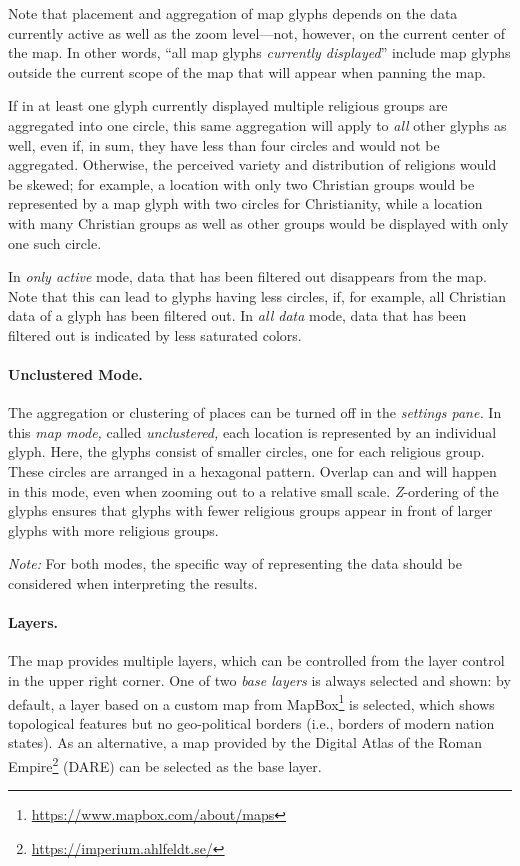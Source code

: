 Note that placement and aggregation of map glyphs depends on the data currently active as well as the zoom level---not, however, on the current center of the map.
In other words, \enquote{all map glyphs \emph{currently displayed}} include map glyphs outside the current scope of the map that will appear when panning the map.

If in at least one glyph currently displayed multiple religious groups are aggregated into one circle, this same aggregation will apply to \emph{all} other glyphs as well, even if, in sum, they have less than four circles and would not be aggregated.
Otherwise, the perceived variety and distribution of religions would be skewed;
for example, a location with only two Christian groups would be represented by a map glyph with two circles for Christianity, while a location with many Christian groups as well as other groups would be displayed with only one such circle.

In \emph{only active} mode, data that has been filtered out disappears from the map.
Note that this can lead to glyphs having less circles, if, for example, all Christian data of a glyph has been filtered out.
In \emph{all data} mode, data that has been filtered out is indicated by less saturated colors.

\paragraph{Unclustered Mode.}
\label{sec:map-unclustered-mode}
The aggregation or clustering of places can be turned off in the \emph{settings pane.}
In this \emph{map mode,} called \emph{unclustered,} each location is represented by an individual glyph.
Here, the glyphs consist of smaller circles, one for each religious group.
These circles are arranged in a hexagonal pattern.
Overlap can and will happen in this mode, even when zooming out to a relative small scale.
\emph{Z}-ordering of the glyphs ensures that glyphs with fewer religious groups appear in front of larger glyphs with more religious groups.

\emph{Note:} For both modes, the specific way of representing the data should be considered when interpreting the results.


\paragraph{Layers.}
The map provides multiple layers, which can be controlled from the layer control in the upper right corner.
One of two \emph{base layers} is always selected and shown:
by default, a layer based on a custom map from MapBox\footnote{\url{https://www.mapbox.com/about/maps}} is selected, which shows topological features but no geo-political borders (i.e., borders of modern nation states).
As an alternative, a map provided by the Digital Atlas of the Roman Empire\footnote{\url{https://imperium.ahlfeldt.se/}} (DARE) can be selected as the base layer.

